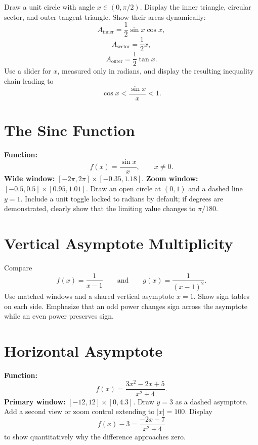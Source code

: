 \begin{bggraphspec}
Draw a unit circle with angle \(x\in(0,\pi/2)\). Display the inner triangle, circular sector, and outer tangent triangle. Show their areas dynamically:
\[
  A_{\mathrm{inner}}=\frac12\sin x\cos x,
\]
\[
  A_{\mathrm{sector}}=\frac12x,
\]
\[
  A_{\mathrm{outer}}=\frac12\tan x.
\]
Use a slider for \(x\), measured only in radians, and display the resulting inequality chain leading to
\[
  \cos x<\frac{\sin x}{x}<1.
\]
\end{bggraphspec}

\section{The Sinc Function}

\begin{bggraphspec}
\textbf{Function:}
\[
  f(x)=\frac{\sin x}{x},\qquad x\ne0.
\]
\textbf{Wide window:} \([-2\pi,2\pi]\times[-0.35,1.18]\). \textbf{Zoom window:} \([-0.5,0.5]\times[0.95,1.01]\). Draw an open circle at \((0,1)\) and a dashed line \(y=1\). Include a unit toggle locked to radians by default; if degrees are demonstrated, clearly show that the limiting value changes to \(\pi/180\).
\end{bggraphspec}

\section{Vertical Asymptote Multiplicity}

\begin{bggraphspec}
Compare
\[
  f(x)=\frac1{x-1}
  \qquad\text{and}\qquad
  g(x)=\frac1{(x-1)^2}.
\]
Use matched windows and a shared vertical asymptote \(x=1\). Show sign tables on each side. Emphasize that an odd power changes sign across the asymptote while an even power preserves sign.
\end{bggraphspec}

\section{Horizontal Asymptote}

\begin{bggraphspec}
\textbf{Function:}
\[
  f(x)=\frac{3x^2-2x+5}{x^2+4}.
\]
\textbf{Primary window:} \([-12,12]\times[0,4.3]\). Draw \(y=3\) as a dashed asymptote. Add a second view or zoom control extending to \(|x|=100\). Display
\[
  f(x)-3=\frac{-2x-7}{x^2+4}
\]
to show quantitatively why the difference approaches zero.
\end{bggraphspec}

